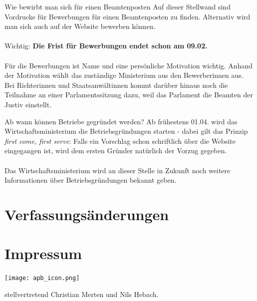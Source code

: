 \documentclass{sasbase}
\begin{document}
\begin{question}{Wie bewirbt man sich für einen Beamtenposten}
    Auf dieser Stellwand sind Vordrucke für Bewerbungen für einen Beamtenposten zu finden. Alternativ wird man sich auch auf der Website bewerben können.\\\\
    Wichtig: \textbf{Die Frist für Bewerbungen endet schon am 09.02.} \\\\Für die Bewerbungen ist Name und eine persönliche Motivation wichtig. Anhand der Motivation
    wählt das zuständige Ministerium aus den Bewerberinnen aus. \\
    Bei Richterinnen und Staatsanwältinnen kommt darüber hinaus noch die Teilnahme an einer Parlamentssitzung dazu, weil das Parlament die Beamten der Justiv einstellt.
\end{question}

\begin{question}{Ab wann können Betriebe gegründet werden?}
    Ab frühestens 01.04. wird das Wirtschaftsministerium die Betriebsgründungen starten - dabei gilt das Prinzip \emph{first come, first serve}: 
    Falls ein Vorschlag schon schriftlich über die Website eingegangen ist, wird dem ersten Gründer natürlich der Vorzug gegeben.\\\\
    Das Wirtschaftsministerium wird an dieser Stelle in Zukunft noch weitere Informationen über Betriebsgründungen bekannt geben.
\end{question}

\section{Verfassungsänderungen}

\section{Impressum}
\begin{minipage}{0.4\linewidth}
\texttt{[image: apb\_icon.png]}
\end{minipage}
\begin{minipage}{0.5\linewidth}
{\raggedright stellvertretend Christian Merten und Nils Hebach.}
\end{minipage}
\end{document}
